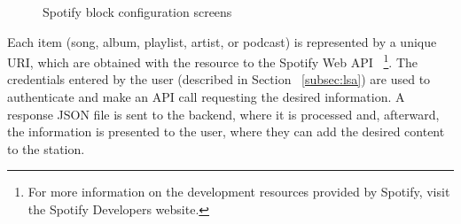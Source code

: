 \begin{figure}[htbp]
	\centering
	 \qquad
	 \qquad
	\caption{Spotify block configuration screens}
	\label{fig:spp1}
\end{figure}

Each item (song, album, playlist, artist, or podcast) is represented by a unique \ac{URI}, which are obtained with the resource to the Spotify Web \ac{API} ~\footnote{For more information on the development resources provided by Spotify, visit the Spotify Developers website.}. The credentials entered by the user (described in Section ~\ref{subsec:lsa}) are used to authenticate and make an API call requesting the desired information. A response JSON file is sent to the backend, where it is processed and, afterward, the information is presented to the user, where they can add the desired content to the station.

